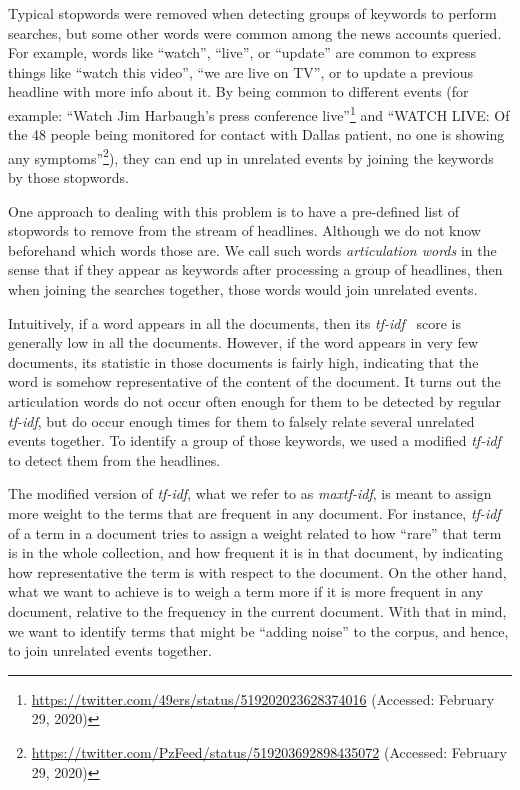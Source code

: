 Typical stopwords were removed when detecting groups of keywords to perform
searches, but some other words were common among the news accounts queried. 
%
For example, words like ``watch'', ``live'', or ``update'' are common to express
things like ``watch this video'', ``we are live on TV'', or to update a previous
headline with more info about it. 
%
By being common to different events (for example: ``Watch Jim Harbaugh's press
conference
live''\footnote{\url{https://twitter.com/49ers/status/519202023628374016}
(Accessed: February 29, 2020)}  and ``WATCH LIVE: Of the 48 people being
monitored for contact with Dallas patient, no one is showing any
symptoms''\footnote{\url{https://twitter.com/PzFeed/status/519203692898435072}
(Accessed: February 29, 2020)}), they can end up in unrelated events by joining
the keywords by those stopwords.


One approach to dealing with this problem is to have a pre-defined list of
stopwords to remove from the stream of headlines. 
%
Although we do not know beforehand which words those are. 
%
We call such words \emph{articulation words} in the sense that if they appear as
keywords after processing a group of headlines, then when joining the searches
together, those words would join unrelated events. 


Intuitively, if a word appears in all the documents, then its {\em
tf-idf}~\cite{sparck1972statistical} score is generally low in all the
documents.  
%
However, if the word appears in very few documents, its statistic in those
documents is fairly high, indicating that the word is somehow representative of
the content of the document. 
%
It turns out the articulation words do not occur often enough for them to be
detected by regular \emph{tf-idf}, but do occur enough times for them to falsely
relate several unrelated events together. 
%
To identify a group of those keywords, we used a modified \emph{tf-idf} to
detect them from the headlines.

The modified version of \emph{tf-idf}, what we refer to as \emph{maxtf-idf}, is
meant to assign more weight to the terms that are frequent in any document. 
%
For instance, \emph{tf-idf} of a term in a document tries to assign a weight
related to how ``rare'' that term is in the whole collection, and how frequent
it is in that document, by indicating how representative the term is with
respect to the document. 
%
On the other hand, what we want to achieve is to weigh a term more if it
is more frequent in any document, relative to the frequency in the current
document. 
%
With that in mind, we want to identify terms that might be ``adding noise'' to
the corpus, and hence, to join unrelated events together.

